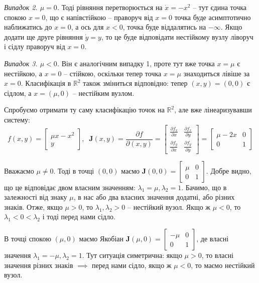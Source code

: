 \documentclass[oneside,solution]{tmpl}
\begin{document}
\textit{Випадок 2. $\mu=0$.} Тоді рівняння перетворюється на $\dot{x} = -x^2$ -- тут єдина точка спокою $x=0$, що є напівстійкою -- праворуч від $x=0$ точка буде асимптотично наближатись до $x=0$, а ось для $x<0$, точка буде віддалятись на $-\infty$. Якщо додати ще друге рівняння $\dot{y}=y$, то це буде відповідати нестійкому вузлу ліворуч і сідлу праворуч від $x=0$.

\textit{Випадок 3. $\mu<0$.} Він є аналогічним випадку 1, проте тут вже точка $x=\mu$ є нестійкою, а $x=0$ -- стійкою, оскільки тепер точка $x=\mu$ знаходиться лівіше за $x=0$. Класифікація в $\mathbb{R}^2$ також зміниться відповідно: тепер $(x,y)=(0,0)$ є сідлом, а $x=(\mu,0)$ -- нестійким вузлом.

Спробуємо отримати ту саму класифікацію точок на $\mathbb{R}^2$, але вже лінеаризувавши систему:
\begin{equation}
    f(x,y) = \begin{bmatrix}\mu x-x^2 \\ y \end{bmatrix}, \;\; \boldsymbol{J}(x,y) = \frac{\partial f}{\partial (x,y)} = \begin{bmatrix}
        \frac{\partial f_x}{\partial x} & \frac{\partial f_x}{\partial y} \\
        \frac{\partial f_y}{\partial x} & \frac{\partial f_y}{\partial y}
    \end{bmatrix} = \begin{bmatrix}
        \mu - 2x & 0 \\
        0 & 1
    \end{bmatrix}
\end{equation}

Вважаємо $\mu \neq 0$. Тоді в точці $(0,0)$ маємо $\boldsymbol{J}(0,0) = \begin{bmatrix}
    \mu & 0 \\ 0 & 1
\end{bmatrix}$. Добре видно, що це відповідає двом власним значенням: $\lambda_1=\mu, \lambda_2 = 1$. Бачимо, що в залежності від знаку $\mu$, в нас або два власних значення додатні, або різних знаків. Отже, якщо $\mu > 0$, то $\lambda_1,\lambda_2>0$ -- нестійкий вузол. Якщо ж $\mu<0$, то $\lambda_1 < 0 < \lambda_2$ і тоді перед нами сідло. 

В точці спокою $(\mu,0)$ маємо Якобіан $\boldsymbol{J}(\mu,0) = \begin{bmatrix}
    -\mu & 0 \\ 0 & 1
\end{bmatrix}$, де власні значення $\lambda_1=-\mu,\lambda_2=1$. Тут ситуація симетрична: якщо $\mu>0$, то власні значення різних знаків $\implies$ перед нами сідло, якщо ж $\mu<0$, то маємо нестійкий вузол.
\end{document}
